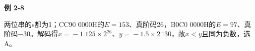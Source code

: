 {\color{ink}\bfseries 例 2-8}\par\vspace{1bp}两位串的s都为1；CC90 0000H的\(E=\allowbreak{}153\)、真阶码26，B0C0 0000H的\(E=\allowbreak{}97\)、真阶码\(-\)30。解码得\(x=\allowbreak{}-1.125\times 2^{26}\)、\(y=\allowbreak{}-1.5\times 2^-30\)，故\(x<\allowbreak{}y\)且同为负数，选A。
